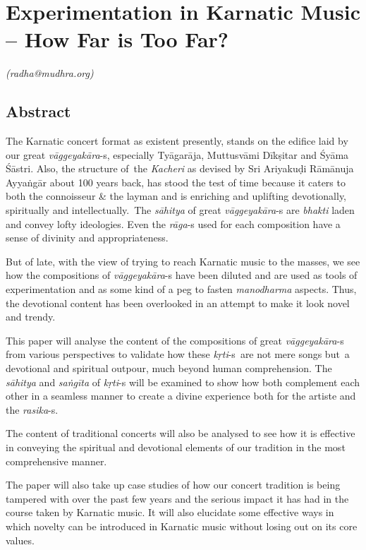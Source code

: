 
\chapter{Experimentation in Karnatic Music – How Far is Too Far?}\label{chapter4}


\begin{flushright}
\textit{(radha@mudhra.org)}
\end{flushright}


\section*{Abstract}

The Karnatic concert format as existent presently, stands on the edifice laid by our great \textit{vāggeyakāra}-s, especially Tyāgarāja, Muttusvāmi Dīkṣitar and Śyāma Śāstri. Also, the structure of the \textit{Kacheri} as devised by Sri Ariyakuḍi Rāmānuja Ayyaṅgār about 100 years back, has stood the test of time because it caters to both the connoisseur \& the layman and is enriching and uplifting devotionally, spiritually and intellectually. The \textit{sāhitya} of great \textit{vāggeyakāra}-s are \textit{bhakti} laden and convey lofty ideologies. Even the \textit{rāga}-s used for each composition have a sense of divinity and appropriateness.

But of late, with the view of trying to reach Karnatic music to the masses, we see how the compositions of \textit{vāggeyakāra}-s have been diluted and are used as tools of experimentation and as some kind of a peg to fasten \textit{manodharma} aspects. Thus, the devotional content has been overlooked in an attempt to make it look novel and trendy.

This paper will analyse the content of the compositions of great \textit{vāggeyakāra}-s from various perspectives to validate how these \textit{kṛti}-s\break  are not mere songs but a devotional and spiritual outpour, much beyond human comprehension. The \textit{sāhitya} and \textit{saṅgīta} of \textit{kṛti}-s will be examined to show how both complement each other in a seamless manner to create a divine experience both for the artiste and the \textit{rasika}-s.

The content of traditional concerts will also be analysed to see how it is effective in conveying the spiritual and devotional elements of our tradition in the most comprehensive manner.

The paper will also take up case studies of how our concert tradition is being tampered with over the past few years and the serious impact it has had in the course taken by Karnatic music. It will also elucidate some effective ways in which novelty can be introduced in Karnatic music without losing out on its core values.


